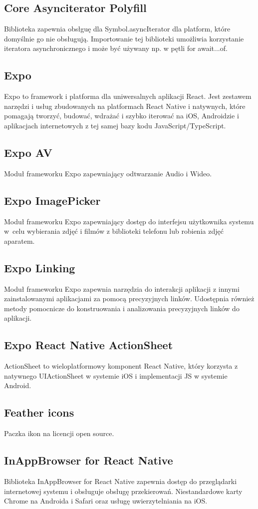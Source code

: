 \documentclass[12pt,a4paper]{article}
\begin{document}
		\subsection{Core Asynciterator Polyfill}
			\indent Biblioteka zapewnia obsłguę dla Symbol.asyncIterator dla platform, które domyślnie go nie obsługują. Importowanie tej biblioteki umożliwia korzystanie iteratora
		asynchronicznego i może być używany np. w pętli for await...of.
		\subsection{Expo}
			\indent Expo to framework i platforma dla uniwersalnych aplikacji React. Jest zestawem narzędzi i usług zbudowanych na platformach React Native i natywnych, które pomagają
		tworzyć, budować, wdrażać i szybko iterować na iOS, Androidzie i aplikacjach internetowych z tej samej bazy kodu JavaScript/TypeScript.
		\subsection{Expo AV}
			\indent Moduł frameworku Expo zapewniający odtwarzanie Audio i Wideo.
		\subsection{Expo ImagePicker}
			\indent Moduł frameworku Expo zapewniający dostęp do interfejsu użytkownika systemu w~celu wybierania zdjęć i filmów z biblioteki telefonu lub robienia zdjęć aparatem.
		\subsection{Expo Linking}
		\indent Moduł frameworku Expo zapewnia narzędzia do interakcji aplikacji z innymi zainstalowanymi aplikacjami za pomocą precyzyjnych linków. Udostępnia również metody
		pomocnicze do konstruowania i analizowania precyzyjnych linków do aplikacji.
		\subsection{Expo React Native ActionSheet}
			ActionSheet to wieloplatformowy komponent React Native, który korzysta z natywnego UIActionSheet w systemie iOS i implementacji JS w systemie Android.
		\subsection{Feather icons}
			\indent Paczka ikon na licencji open source.
		\subsection{InAppBrowser for React Native}
			\indent Biblioteka InAppBrowser for React Native zapewnia dostęp do przeglądarki internetowej systemu i obsługuje obsługę przekierowań. Niestandardowe karty Chrome
			na Androida i Safari oraz usługę uwierzytelniania na iOS.
\end{document}
